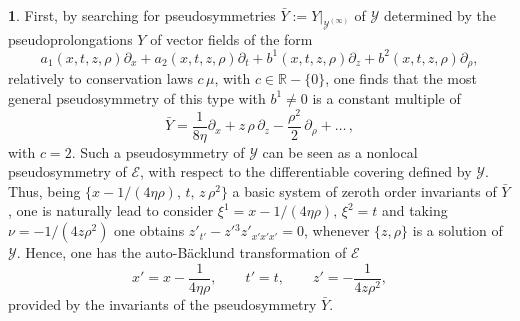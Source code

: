 \documentclass[12pt,english]{elsarticle}
\theoremstyle{plain}
\theoremstyle{plain}
\theoremstyle{remark}
\theoremstyle{plain}
\theoremstyle{definition}
\theoremstyle{definition}
\newtheorem{example}[thm]{\protect\examplename}
\providecommand{\examplename}{Example}
\begin{document}
\begin{example}
First, by searching for pseudosymmetries
$\bar{Y}:=\left .Y\right |_{\mathcal{Y}^{(\infty )}}$ of
$\mathcal{Y}$ determined by the pseudoprolongations $Y$ of vector fields
of the form
%
\begin{equation*}
a_{1}(x,t,z,\rho )\partial _{x}+a_{2}(x,t,z,\rho )\partial _{t}+b^{1}(x,t,z,
\rho )\partial _{z}+b^{2}(x,t,z,\rho )\partial _{\rho},
\end{equation*}
%
relatively to conservation laws $c\,\mu $, with
$c\in \mathbb{R}-\{0\}$, one finds that the most general pseudosymmetry
of this type with $b^{1}\neq 0$ is a constant multiple of
%
\begin{equation*}
\bar{Y}=\frac{1}{8\eta}\partial _{x}+z\,\rho \,\partial _{z}-
\frac{\rho ^{2}}{2}\,\partial _{\rho}+\ldots \,,
\end{equation*}
%
with $c=2$. Such a pseudosymmetry of $\mathcal{Y}$ can be seen as a nonlocal
pseudosymmetry of $\mathcal{E}$, with respect to the differentiable covering
defined by $\mathcal{Y}$. Thus, being
$\{x-1/(4\eta \rho ),\,t,\,z\,\rho ^{2}\}$ a basic system of zeroth order
invariants of $\bar{Y}$, one is naturally lead to consider
$\xi ^{1}=x-1/(4\eta \rho ),\,\xi ^{2}=t$ and taking
$\nu =-1/(4z\rho ^{2})$ one obtains $z'_{t'}-z'{}^{3}z'_{x'x'x'}=0$, whenever
$\{z,\rho \}$ is a solution of $\mathcal{Y}$. Hence, one has the auto-B\"{a}cklund
transformation of $\mathcal{E}$
%
\begin{equation*}
x'=x-\frac{1}{4\eta \rho},\qquad t'=t,\qquad z'=-
\frac{1}{4z\rho ^{2}},
\end{equation*}
%
provided by the invariants of the pseudosymmetry $\bar{Y}$.
\end{example}
\end{document}
